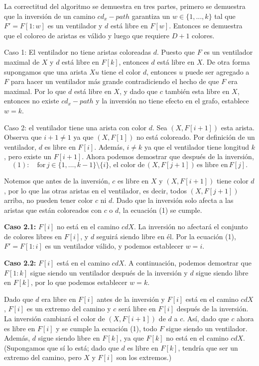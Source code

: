 \documentclass[a4paper]{article}
\begin{document}
La correctitud del algoritmo se demuestra en tres partes, primero se demuestra que la inversi\'on de un camino $cd_x-path$ garantiza un $w \in \{1,...,k\}$ tal que $F' = F[1:w]$ es un ventilador y $d$ est\'a libre en $F[w]$. Entonces se demuestra que el coloreo de aristas es v\'alido y luego que requiere $D+1$ colores.

Caso 1: El ventilador no tiene aristas coloreadas $d$. Puesto que $F$ es un ventilador maximal de $X$ y $d$ est\'a libre en $F[k]$, entonces $d$ est\'a libre en $X$. De otra forma supongamos que una arista $Xu$ tiene el color $d$, entonces $u$ puede ser agregado a $F$ para hacer un ventilador m\'as grande contradiciendo el hecho de que $F$ era maximal. Por lo que $d$ est\'a libre en $X$, y dado que $c$ tambi\'en esta libre en $X$, entonces no existe $cd_x-path$ y la inversi\'on no tiene efecto en el grafo, establece $w = k$.

Caso 2: el ventilador tiene una arista con color \( d \). Sea \( (X, F[i+1]) \) esta arista. Observa que \( i+1 \neq 1 \) ya que \( (X, F[1]) \) no está coloreado. Por definición de un ventilador, \( d \) es libre en \( F[i] \). Además, \( i \neq k \) ya que el ventilador tiene longitud \( k \), pero existe un \( F[i+1] \). Ahora podemos demostrar que después de la inversión,
\[
(1): \quad \text{for} \, j \in \{1, \dots, k-1\} \setminus \{i\}, \, \text{el color de} \, (X, F[j+1]) \, \text{es libre en} \, F[j].
\]


Notemos que antes de la inversión, \( c \) es libre en \( X \) y \( (X, F[i+1]) \) tiene color \( d \), por lo que las otras aristas en el ventilador, es decir, todos \( (X, F[j+1]) \) arriba, no pueden tener color \( c \) ni \( d \). Dado que la inversión solo afecta a las aristas que están coloreados con \( c \) o \( d \), la ecuación (1) se cumple.

\textbf{Caso 2.1:} \( F[i] \) no está en el camino \( cdX \). La inversión no afectará el conjunto de colores libres en \( F[i] \), y \( d \) seguirá siendo libre en él. Por la ecuación (1), \( F' = F[1:i] \) es un ventilador válido, y podemos establecer \( w = i \).

\textbf{Caso 2.2:} \( F[i] \) está en el camino \( cdX \). A continuación, podemos demostrar que \( F[1:k] \) sigue siendo un ventilador después de la inversión y \( d \) sigue siendo libre en \( F[k] \), por lo que podemos establecer \( w = k \).

Dado que \( d \) era libre en \( F[i] \) antes de la inversión y \( F[i] \) está en el camino \( cdX \), \( F[i] \) es un extremo del camino y \( c \) será libre en \( F[i] \) después de la inversión. La inversión cambiará el color de \( (X, F[i+1]) \) de \( d \) a \( c \). Así, dado que \( c \) ahora es libre en \( F[i] \) y se cumple la ecuación (1), todo \( F \) sigue siendo un ventilador. Además, \( d \) sigue siendo libre en \( F[k] \), ya que \( F[k] \) no está en el camino \( cdX \). (Supongamos que sí lo está; dado que \( d \) es libre en \( F[k] \), tendría que ser un extremo del camino, pero \( X \) y \( F[i] \) son los extremos.)
\end{document}
